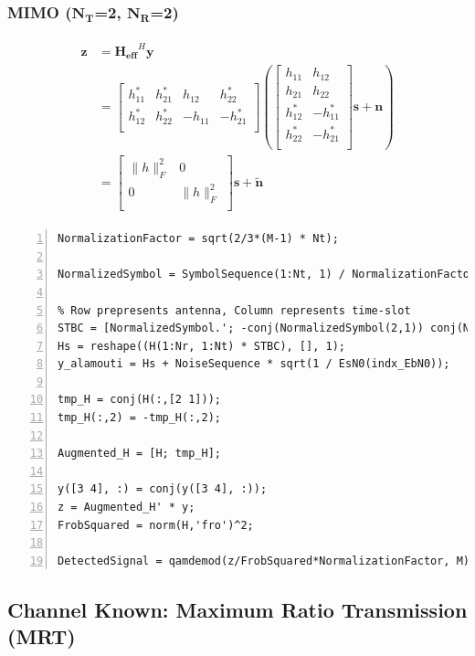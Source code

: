 \documentclass{article}
\begin{document}
\subsubsection[MIMO ($N_T$=2, $N_R$=2)]{MIMO ($\boldsymbol{N_T}$=2, $\boldsymbol{N_R}$=2)}
\begin{gather}
\begin{split}
\boldsymbol{z}&=\boldsymbol{H_{eff}}^H\boldsymbol{y}\\
&=
\begin{bmatrix}
h_{11}^* & h_{21}^* & h_{12} & h_{22}^*\\
h_{12}^* & h_{22}^* & -h_{11} & -h_{21}^*\\
\end{bmatrix}
(
\begin{bmatrix}
h_{11} & h_{12}\\
h_{21} & h_{22}\\
h_{12}^* & -h_{11}^*\\
h_{22}^* & -h_{21}^*\\
\end{bmatrix}
\boldsymbol{s}+\boldsymbol{n})\\
&=
\begin{bmatrix}
\lVert h\rVert_F^2 & 0\\
0 & \lVert{h}\rVert_F^2\\
\end{bmatrix}
\boldsymbol{s}+\tilde{\boldsymbol{n}}
\end{split}
\end{gather}
\begin{lstlisting}[style=Matlab-editor, frame=single, numbers=left,]
NormalizationFactor = sqrt(2/3*(M-1) * Nt);

NormalizedSymbol = SymbolSequence(1:Nt, 1) / NormalizationFactor;

% Row prepresents antenna, Column represents time-slot
STBC = [NormalizedSymbol.'; -conj(NormalizedSymbol(2,1)) conj(NormalizedSymbol(1,1))].';
Hs = reshape((H(1:Nr, 1:Nt) * STBC), [], 1);
y_alamouti = Hs + NoiseSequence * sqrt(1 / EsN0(indx_EbN0));

tmp_H = conj(H(:,[2 1]));
tmp_H(:,2) = -tmp_H(:,2);

Augmented_H = [H; tmp_H];

y([3 4], :) = conj(y([3 4], :));
z = Augmented_H' * y;
FrobSquared = norm(H,'fro')^2;

DetectedSignal = qamdemod(z/FrobSquared*NormalizationFactor, M);
\end{lstlisting}

\subsection{Channel Known: Maximum Ratio Transmission (MRT)}
\end{document}
